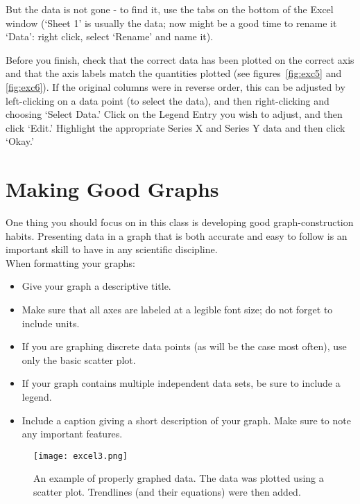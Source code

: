 But the data is not gone - to find it, use the tabs on the bottom of the Excel window (`Sheet 1' is usually the data; now might be a good time to rename it `Data': right click, select `Rename' and name it).
\par 
Before you finish, check that the correct data has been plotted on the correct axis and that the axis labels match the quantities plotted (see figures~\ref{fig:exc5} and \ref{fig:exc6}). 
If the original columns were in reverse order, this can be adjusted by left-clicking on a data point (to select the data), and then right-clicking and choosing `Select Data.' 
Click on the Legend Entry you wish to adjust, and then click `Edit.' 
Highlight the appropriate Series X and Series Y data and then click `Okay.'

\section*{Making Good Graphs}
One thing you should focus on in this class is developing good graph-construction habits.
Presenting data in a graph that is both accurate and easy to follow is an important skill to have in any scientific discipline. \\
When formatting your graphs:
\begin{itemize}
\itemsep-0.3em
\item Give your graph a descriptive title.
\item Make sure that all axes are labeled at a legible font size; do not forget to include units.
\item If you are graphing discrete data points (as will be the case most often), use only the basic scatter plot.
\item If your graph contains multiple independent data sets, be sure to include a legend.
\item Include a caption giving a short description of your graph. Make sure to note any important features.
\end{itemize}
\begin{figure}[ht]
\texttt{[image: excel3.png]}
\centering
\caption{An example of properly graphed data. The data was plotted using a scatter plot. Trendlines (and their equations) were then added.}
\label{fig:exc3}
\end{figure}

